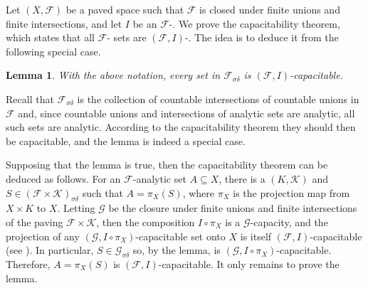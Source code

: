 \documentclass[12pt]{article}
\newtheorem*{lemma*}{Lemma}
\begin{document}

Let $(X,\mathcal{F})$ be a paved space such that $\mathcal{F}$ is closed under finite unions and finite intersections, and let $I$ be an $\mathcal{F}$-. We prove the capacitability theorem, which states that all $\mathcal{F}$- sets are $(\mathcal{F},I)$-. The idea is to deduce it from the following special case.

\begin{lemma*}
With the above notation, every set in $\mathcal{F}_{\sigma\delta}$ is $(\mathcal{F},I)$-capacitable.
\end{lemma*}

Recall that $\mathcal{F}_{\sigma\delta}$ is the collection of countable intersections of countable unions in $\mathcal{F}$ and, since countable unions and intersections of analytic sets are analytic, all such sets are analytic. According to the capacitability theorem they should then be capacitable, and the lemma is indeed a special case.

Supposing that the lemma is true, then the capacitability theorem can be deduced as follows. For an $\mathcal{F}$-analytic set $A\subseteq X$, there is a  $(K,\mathcal{K})$ and $S\in(\mathcal{F}\times\mathcal{K})_{\sigma\delta}$ such that $A=\pi_X(S)$, where $\pi_X$ is the projection map from $X\times K$ to $X$. Letting $\mathcal{G}$ be the closure under finite unions and finite intersections of the paving $\mathcal{F}\times\mathcal{K}$, then the composition $I\circ\pi_X$ is a $\mathcal{G}$-capacity, and the projection of any $(\mathcal{G},I\circ\pi_X)$-capacitable set onto $X$ is itself $(\mathcal{F},I)$-capacitable (see ). In particular, $S\in\mathcal{G}_{\sigma\delta}$ so, by the lemma, is $(\mathcal{G},I\circ\pi_X)$-capacitable. Therefore, $A=\pi_X(S)$ is $(\mathcal{F},I)$-capacitable. It only remains to prove the lemma.
\end{document}
